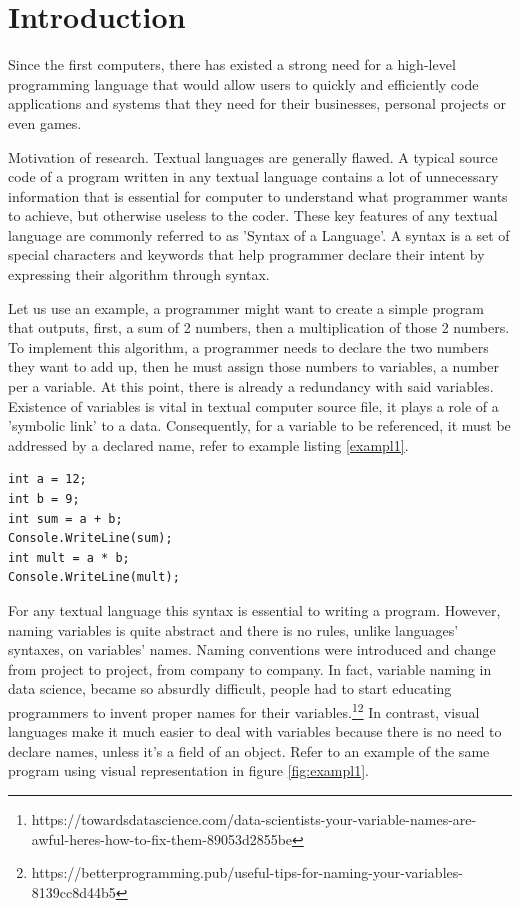 \documentclass{article}
\begin{document}
\section{Introduction}
Since the first computers, there has existed a strong need for a high-level programming language that would allow users to quickly and efficiently code applications and systems that they need for their businesses, personal projects or even games.

Motivation of research.
Textual languages are generally flawed. A typical source code of a program written in any textual language contains a lot of unnecessary information that is essential for computer to understand what programmer wants to achieve, but otherwise useless to the coder. These key features of any textual language are commonly referred to as 'Syntax of a Language'. A syntax is a set of special characters and keywords that help programmer declare their intent by expressing their algorithm through syntax. 

Let us use an example, a programmer might want to create a simple program that outputs, first, a sum of 2 numbers, then a multiplication of those 2 numbers. To implement this algorithm, a programmer needs to declare the two numbers they want to add up, then he must assign those numbers to variables, a number per a variable. At this point, there is already a redundancy with said variables. Existence of variables is vital in textual computer source file, it plays a role of a 'symbolic link' to a data. Consequently, for a variable to be referenced, it must be addressed by a declared name, refer to example listing \ref{exampl1}.

\begin{lstlisting}[frame=single, label=exampl1, caption=Sum and Multiply]
int a = 12;
int b = 9;
int sum = a + b;
Console.WriteLine(sum);
int mult = a * b;
Console.WriteLine(mult);
\end{lstlisting}

For any textual language this syntax is essential to writing a program. However, naming variables is quite abstract and there is no rules, unlike languages' syntaxes, on variables' names. Naming conventions were introduced and change from project to project, from company to company. In fact, variable naming in data science, became so absurdly difficult, people had to start educating programmers to invent proper names for their variables.\footnote{https://towardsdatascience.com/data-scientists-your-variable-names-are-awful-heres-how-to-fix-them-89053d2855be}\footnote{https://betterprogramming.pub/useful-tips-for-naming-your-variables-8139cc8d44b5}
In contrast, visual languages make it much easier to deal with variables because there is no need to declare names, unless it's a field of an object. Refer to an example of the same program using visual representation in figure \ref{fig:exampl1}.
\end{document}
